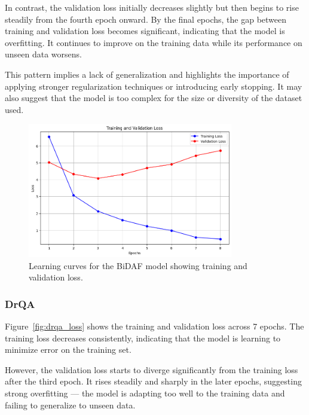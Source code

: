 \documentclass[runningheads]{llncs}
\begin{document}
In contrast, the validation loss initially decreases slightly but then begins to rise steadily from the fourth epoch onward. By the final epochs, the gap between training and validation loss becomes significant, indicating that the model is overfitting. It continues to improve on the training data while its performance on unseen data worsens.

This pattern implies a lack of generalization and highlights the importance of applying stronger regularization techniques or introducing early stopping. It may also suggest that the model is too complex for the size or diversity of the dataset used.
\begin{figure}[H]
\centering
\includegraphics[width=0.8\textwidth]{images/bidaf_loss.png}
\caption{Learning curves for the BiDAF model showing training and validation loss.}
\label{fig:bidaf_loss}
\end{figure}

\subsubsection*{DrQA}
Figure~\ref{fig:drqa_loss} shows the training and validation loss across 7 epochs. The training loss decreases consistently, indicating that the model is learning to minimize error on the training set.

However, the validation loss starts to diverge significantly from the training loss after the third epoch. It rises steadily and sharply in the later epochs, suggesting strong overfitting — the model is adapting too well to the training data and failing to generalize to unseen data.
\end{document}
